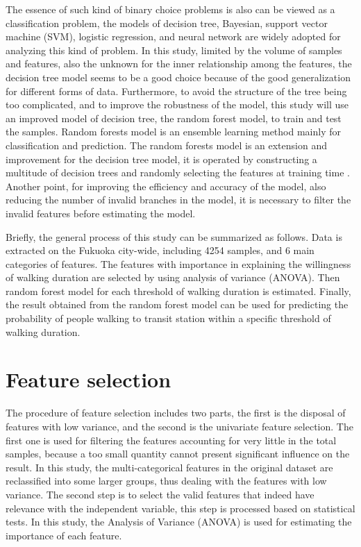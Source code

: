 \documentclass[Journal,letterpaper]{ascelike-new}
\begin{document}
%
The essence of such kind of binary choice problems is also can be viewed as a classification problem, the models of decision tree, Bayesian, support vector machine (SVM), logistic regression, and neural network are widely adopted for analyzing this kind of problem. In this study, limited by the volume of samples and features, also the unknown for the inner relationship among the features, the decision tree model seems to be a good choice because of the good generalization for different forms of data. Furthermore, to avoid the structure of the tree being too complicated, and to improve the robustness of the model, this study will use an improved model of decision tree, the random forest model, to train and test the samples. Random forests model is an ensemble learning method mainly for classification and prediction. The random forests model is an extension and improvement for the decision tree model, it is operated by constructing a multitude of decision trees and randomly selecting the features at training time \cite{Ho1995,Ho1998}. Another point, for improving the efficiency and accuracy of the model, also reducing the number of invalid branches in the model, it is necessary to filter the invalid features before estimating the model.

%
Briefly, the general process of this study can be summarized as follows. Data is extracted on the Fukuoka city-wide, including 4254 samples, and 6 main categories of features. The features with importance in explaining the willingness of walking duration are selected by using analysis of variance (ANOVA). Then random forest model for each threshold of walking duration is estimated. Finally, the result obtained from the random forest model can be used for predicting the probability of people walking to transit station within a specific threshold of walking duration.

%
\section{Feature selection}
The procedure of feature selection includes two parts, the first is the disposal of features with low variance, and the second is the univariate feature selection. The first one is used for filtering the features accounting for very little in the total samples, because a too small quantity cannot present significant influence on the result. In this study, the multi-categorical features in the original dataset are reclassified into some larger groups, thus dealing with the features with low variance. The second step is to select the valid features that indeed have relevance with the independent variable, this step is processed based on statistical tests. In this study, the Analysis of Variance (ANOVA) is used for estimating the importance of each feature.
\end{document}

